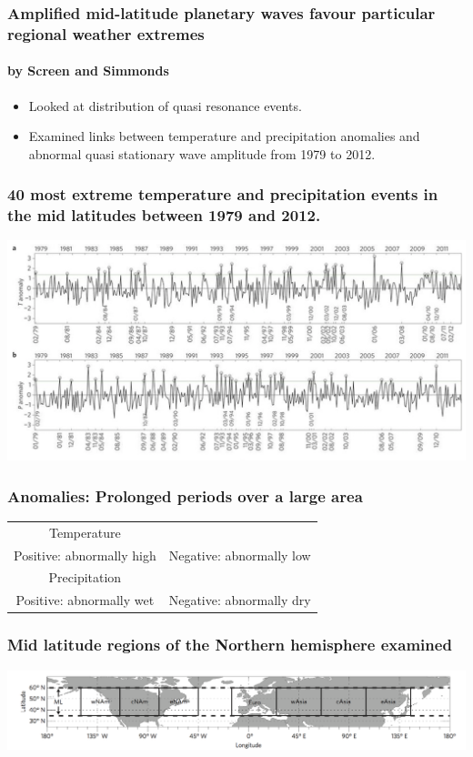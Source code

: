\documentclass{beamer}
\begin{document}
\begin{frame}
\frametitle{Amplified mid-latitude planetary waves favour particular regional weather extremes}
\framesubtitle{ 
	by Screen and Simmonds }
\begin{itemize}
	\item Looked at distribution of quasi resonance events.
	\item Examined links between temperature and precipitation anomalies and abnormal quasi stationary wave amplitude from 1979 to 2012.
	
\end{itemize}
\end{frame}
\begin{frame}
\frametitle{40 most extreme temperature and precipitation events in the mid latitudes between 1979 and 2012.}
\centering
\includegraphics[scale=0.53]{Cathie1}


\end{frame}
\begin{frame}
\frametitle{Anomalies: Prolonged periods over a large area}
\begin{tabular}{c c}
\huge{Temperature}&\vspace{5pt}\\

\Large{Positive: abnormally high}	&	\Large{	Negative: abnormally low}\vspace{20pt}\\

\huge{Precipitation}&\vspace{5pt}\\
\Large{Positive: abnormally wet} &		\Large{	Negative: abnormally dry}\\
\end{tabular}


\end{frame}
\begin{frame}
\frametitle{Mid latitude regions of the Northern hemisphere examined}
\centering
\includegraphics[scale=0.3]{Cathie2}
\end{frame}
\end{document}
